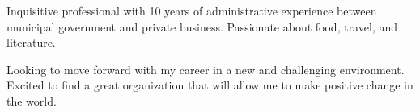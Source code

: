 

\begin{cvparagraph}

Inquisitive professional with 10 years of administrative experience between municipal government and private business.
Passionate about food, travel, and literature.

Looking to move forward with my career in a new and challenging environment.
Excited to find a great organization that will allow me to make positive change in the world.
\end{cvparagraph}
